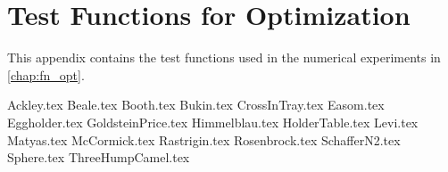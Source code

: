 \chapter{Test Functions for Optimization}
\label{app:test_functions}
  This appendix contains the test functions used in the numerical experiments in 
  \vref{chap:fn_opt}.

  {Ackley.tex}
  {Beale.tex}
  {Booth.tex}
  {Bukin.tex}
  {CrossInTray.tex}
  {Easom.tex}
  {Eggholder.tex}
  {GoldsteinPrice.tex}
  {Himmelblau.tex}
  {HolderTable.tex}
  {Levi.tex}
  {Matyas.tex}
  {McCormick.tex}
  {Rastrigin.tex}
  {Rosenbrock.tex}
  {SchafferN2.tex}
  {Sphere.tex}
  {ThreeHumpCamel.tex}